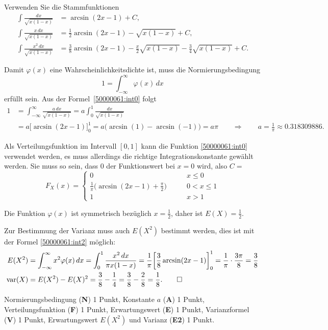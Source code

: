 \begin{hinweis}
Verwenden Sie die Stammfunktionen
\begin{align}
\int\frac{dx}{\sqrt{x(1-x)}}
&=
\arcsin(2x-1) + C,
\label{50000061:int0}
\\
\int\frac{x\,dx}{\sqrt{x(1-x)}}
&=
\frac12\arcsin(2x-1) - \sqrt{x(1-x)} + C,
\label{50000061:int1}
\\
\int\frac{x^2\,dx}{\sqrt{x(1-x)}}
&=
\frac38\arcsin(2x-1) - \frac{x}2\sqrt{x(1-x)} - \frac34\sqrt{x(1-x)} + C.
\label{50000061:int2}
\end{align}
\end{hinweis}

\begin{loesung}
\begin{teilaufgaben}
\item
Damit $\varphi(x)$ eine Wahrscheinlichkeitsdichte ist, muss die
Normierungsbedingung
\[
1
=
\int_{-\infty}^\infty \varphi(x)\,dx
\]
erfüllt sein.
Aus der Formel~\eqref{50000061:int0} folgt
\begin{align*}
1
&=
\int_{-\infty}^\infty \frac{a\,dx}{\sqrt{x(1-x)}}
=
a\int_0^1 \frac{dx}{\!\sqrt{x(1-x)}}
\\
&=
a
\biggl[
\arcsin(2x-1)
\biggr]_0^1
=
a\bigl(\arcsin(1) - \arcsin(-1)\bigr)
=
a\pi
\qquad\Rightarrow\qquad
a=\frac{1}{\pi}\approx 0.318309886.
\end{align*}
\item
Als Verteilungsfunktion im Intervall $[0,1]$ kann die Funktion
\eqref{50000061:int0} verwendet werden, es muss allerdings die
richtige Integrationskonstante gewählt werden.
Sie muss so sein, dass $0$ der Funktionswert bei $x=0$ wird,
also $C=$
\[
F_X(x)
=
\begin{cases}
0&\qquad x\le 0\\
\frac{1}{\pi}\bigl(\arcsin(2x-1)+\frac{\pi}2\bigr) &\qquad 0<x\le 1\\
1&\qquad x>1
\end{cases}
\]
\item
Die Funktion $\varphi(x)$ ist symmetrisch bezüglich $x=\frac12$, daher ist
$E(X)=\frac12$.
\item
Zur Bestimmung der Varianz muss auch $E(X^2)$ bestimmt werden, dies ist
mit der Formel \eqref{50000061:int2} möglich:
\begin{align*}
E(X^2)
&=
\int_{-\infty}^\infty x^2 \varphi(x)\,dx
=
\int_0^1 \frac{x^2\,dx}{\pi x(1-x)}
=
\frac{1}{\pi}
\biggl[
\frac38 \arcsin(2x-1)
\biggr]_0^1
=
\frac{1}{\pi}\cdot
\frac{3\pi}{8}
=
\frac{3}{8}
\\
\operatorname{var}(X)
&=
E(X^2)-E(X)^2
=
\frac{3}{8} -\frac14
=
\frac38-\frac28
=
\frac18.
\qedhere
\end{align*}
\end{teilaufgaben}
\end{loesung}

\begin{bewertung}
Normierungsbedingung ({\bf N}) 1 Punkt,
Konstante $a$ ({\bf A}) 1 Punkt,
Verteilungsfunktion ({\bf F}) 1 Punkt,
Erwartungswert ({\bf E}) 1 Punkt,
Varianzformel ({\bf V}) 1 Punkt,
Erwartungswert $E(X^2)$ und Varianz ({\bf E2}) 1 Punkt.
\end{bewertung}
